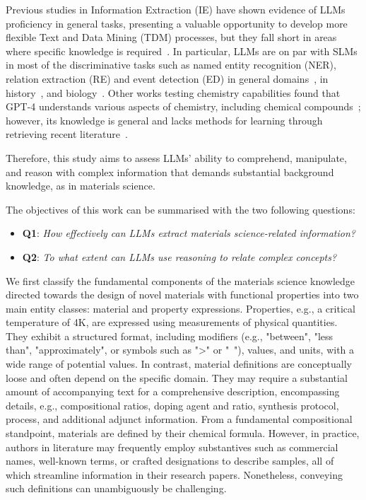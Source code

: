 Previous studies in Information Extraction (IE) have shown evidence of LLMs proficiency in general tasks, presenting a valuable opportunity to develop more flexible Text and Data Mining (TDM) processes, but they fall short in areas where specific knowledge is required~\cite{kokon2023chatgpt}. In particular, LLMs are on par with SLMs in most of the discriminative tasks such as named entity recognition (NER), relation extraction (RE) and event detection (ED) in general domains~\cite{ma2023large}, in history~\cite{gonzalez2023yes}, and biology~\cite{moradi2022gpt3}. 
Other works testing chemistry capabilities found that GPT-4 understands various aspects of chemistry, including chemical compounds~\cite{hatakeyama2023prompt}; however, its knowledge is general and lacks methods for learning through retrieving recent literature~\cite{hatakeyama2023using}.

Therefore, this study aims to assess LLMs' ability to comprehend, manipulate, and reason with complex information that demands substantial background knowledge, as in materials science. 

The objectives of this work can be summarised with the two following questions: 
\begin{itemize}
    \item \textbf{Q1}: \textit{How effectively can LLMs extract materials science-related information?}
    \item \textbf{Q2}: \textit{To what extent can LLMs use reasoning to relate complex concepts?}
\end{itemize}

\vspace{.1cm}
We first classify the fundamental components of the materials science knowledge directed towards the design of novel materials with functional properties into two main entity classes: material and property expressions. 
Properties, e.g., a critical temperature of 4K, are expressed using measurements of physical quantities. 
They exhibit a structured format, including modifiers (e.g., "between", "less than", "approximately", or symbols such as ">" or "~"), values, and units, with a wide range of potential values. 
In contrast, material definitions are conceptually loose and often depend on the specific domain. They may require a substantial amount of accompanying text for a comprehensive description, encompassing details, e.g., compositional ratios, doping agent and ratio, synthesis protocol, process, and additional adjunct information. 
From a fundamental compositional standpoint, materials are defined by their chemical formula. However, in practice, authors in literature may frequently employ substantives such as commercial names, well-known terms, or crafted designations to describe samples, all of which streamline information in their research papers. Nonetheless, conveying such definitions can unambiguously be challenging.

